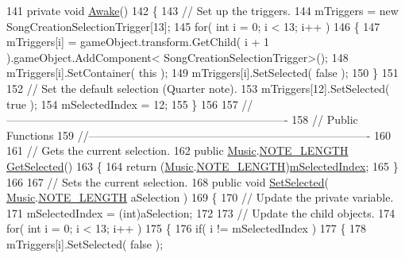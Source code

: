 \begin{DoxyCodeInclude}
141         \textcolor{keyword}{private} \textcolor{keywordtype}{void} \hyperlink{group___s_c_m_nest_class_ae7264acac3310f5db50df38467734c06}{Awake}()
142         \{
143             \textcolor{comment}{// Set up the triggers.}
144             mTriggers = \textcolor{keyword}{new} SongCreationSelectionTrigger[13];
145             \textcolor{keywordflow}{for}( \textcolor{keywordtype}{int} i = 0; i < 13; i++ )
146             \{
147                 mTriggers[i] = gameObject.transform.GetChild( i + 1 ).gameObject.AddComponent<
      SongCreationSelectionTrigger>();
148                 mTriggers[i].SetContainer( \textcolor{keyword}{this} );
149                 mTriggers[i].SetSelected( \textcolor{keyword}{false} );
150             \}
151 
152             \textcolor{comment}{// Set the default selection (Quarter note).}
153             mTriggers[12].SetSelected( \textcolor{keyword}{true} );
154             mSelectedIndex = 12;
155         \}
156 
157         \textcolor{comment}{//---------------------------------------------------------------------------- }
158         \textcolor{comment}{// Public Functions}
159         \textcolor{comment}{//----------------------------------------------------------------------------}
160 
161         \textcolor{comment}{// Gets the current selection.}
162         \textcolor{keyword}{public} \hyperlink{class_music}{Music}.\hyperlink{group___music_enums_gaf11b5f079adbb21c800b9eca1c5c3cbd}{NOTE\_LENGTH} \hyperlink{group___s_c_m_nest_class_ae73f2b2c2f567ecaf6ce10f85c30956a}{GetSelected}()
163         \{
164             \textcolor{keywordflow}{return} (\hyperlink{class_music}{Music}.\hyperlink{group___music_enums_gaf11b5f079adbb21c800b9eca1c5c3cbd}{NOTE\_LENGTH})\hyperlink{group___s_c_m_nest_class_a1684b25b3eb0e87f189996de22bf9792}{mSelectedIndex};
165         \}
166 
167         \textcolor{comment}{// Sets the current selection.}
168         \textcolor{keyword}{public} \textcolor{keywordtype}{void} \hyperlink{group___s_c_m_nest_class_a0d65cd109a370034f580d63e823725b9}{SetSelected}( \hyperlink{class_music}{Music}.\hyperlink{group___music_enums_gaf11b5f079adbb21c800b9eca1c5c3cbd}{NOTE\_LENGTH} aSelection )
169         \{
170             \textcolor{comment}{// Update the private variable.}
171             mSelectedIndex = (int)aSelection;
172 
173             \textcolor{comment}{// Update the child objects.}
174             \textcolor{keywordflow}{for}( \textcolor{keywordtype}{int} i = 0; i < 13; i++ )
175             \{
176                 \textcolor{keywordflow}{if}( i != mSelectedIndex )
177                 \{
178                     mTriggers[i].SetSelected( \textcolor{keyword}{false} );

\end{DoxyCodeInclude}
